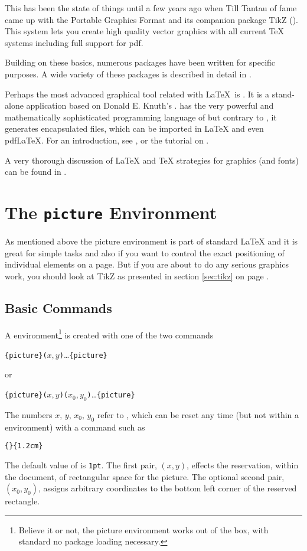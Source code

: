 This has been the state of things until a few years ago when Till Tantau of
 fame came up with the Portable Graphics Format  and its
companion package TikZ (). This system lets you create high
quality vector graphics with all current \TeX{} systems including full
support for pdf.

Building on these basics, numerous packages have been written for specific
purposes. A wide variety of these packages is described in detail in
\graphicscompanion{}.

Perhaps the most advanced graphical tool related with \LaTeX\ is \MP. It is a stand-alone application
based on Donald E. Knuth's \MF. \MP{} has the very powerful and
mathematically sophisticated programming language of \MF{} but contrary to \MF,
it generates encapsulated \PSi{} files,
which can be imported in \LaTeX{} and even pdf\LaTeX{}. For an introduction, see \hobby, or the tutorial on \cite{ursoswald}.

A very thorough discussion of \LaTeX{} and \TeX{} strategies for graphics (and fonts) can
be found in \hoenig.

\section{The \texttt{picture} Environment}

As mentioned above the picture environment is part of standard \LaTeX{} and it is great for simple tasks and also if you want
to control the exact positioning of individual elements on a page. But if you are about to do any serious graphics work, you should
look at TikZ as presented in section \ref{sec:tikz} on page \pageref{sec:tikz}.

\subsection{Basic Commands}

A  environment\footnote{Believe it or not, the picture environment works out of the
box, with standard \LaTeXe{} no package loading necessary.} is created with one of the two commands
\begin{lscommand}
\verb|{picture}(|$x,y$\verb|)|\ldots{}\verb|{picture}|
\end{lscommand}
\noindent or
\begin{lscommand}
\verb|{picture}(|$x,y$\verb|)(|$x_0,y_0$\verb|)|\ldots{}\verb|{picture}|
\end{lscommand}
The numbers $x,\,y,\,x_0,\,y_0$ refer to , which can be reset any time
(but not within a  environment) with a command such as
\begin{lscommand}
\verb|{|\verb|}{1.2cm}|
\end{lscommand}
The default value of  is \texttt{1pt}. The first pair, $(x,y)$, effects
the reservation, within the document, of rectangular space for the picture. The optional
second pair, $(x_0,y_0)$, assigns arbitrary coordinates to the bottom left corner of the
reserved rectangle.

